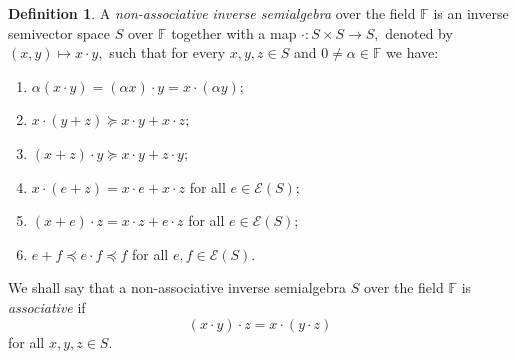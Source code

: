 \documentclass[10pt,a4paper]{amsart}
\theoremstyle{definition}
\newtheorem{defn}[thm]{Definition}
\theoremstyle{remark}
\numberwithin{equation}{section}
\newtheorem*{Theorem A}{\textbf{Theorem A}}
\newtheorem*{Corollary E}{\textbf{Corollary E}}
\newtheorem*{Corollary F}{\textbf{Corollary F}}
\newtheorem*{Theorem B}{\textbf{Theorem B}}
\newtheorem*{Theorem C}{\textbf{Theorem C}}
\newtheorem*{Theorem D}{\textbf{Theorem B}}
\newtheorem*{p a}{\textbf{Proof of  Theorem A}}
\newtheorem*{p b}{\textbf{Proof of Theorem B}}
\newtheorem*{p c}{\textbf{Proof of  Theorem C}}
\newtheorem*{p d}{\textbf{Proof of  Theorem D}}
\newcommand{\E}{\mathcal{E}}
\newcommand{\F}{\mathbb{F}}
\newcommand{\0}{{\vartheta}}
\begin{document}
\begin{defn}\label{def4}
A  {\em non-associative inverse semialgebra}   over the field $\mathbb{F}$ is an inverse semivector space $S$ over  $\mathbb{F}$ together with 
a map  $\cdot:S \times S \rightarrow S,$ denoted by $(x,y)\mapsto x\cdot y,$ such that for every $x,y,z\in S$ and $0\neq \alpha\in \F$ we have:
\begin{enumerate}
\item $\alpha (x\cdot y)=(\alpha x)\cdot y=x\cdot (\alpha y);$

\item $x\cdot ( y+z)\succeq x\cdot y+x \cdot z;$
\item $(x+z)\cdot y\succeq x\cdot y+z\cdot y;$

\item $x\cdot ( e+z)= x\cdot e+x \cdot z$ for all $e\in \E(S);$
 \item $(x+e)\cdot z= x\cdot z+e\cdot z$  for all $e\in \E(S);$
 \item $e+f \preceq  e\cdot f \preceq  f $  for all $e,f\in \E(S).$
\end{enumerate}
\end{defn}


We shall say that  a non-associative inverse semialgebra  $S$ over the field  $\mathbb{F}$ is {\em associative}  if  $$(x\cdot y)\cdot z=x\cdot ( y\cdot z)$$
for all $ x,y,z \in S.$  
\end{document}
